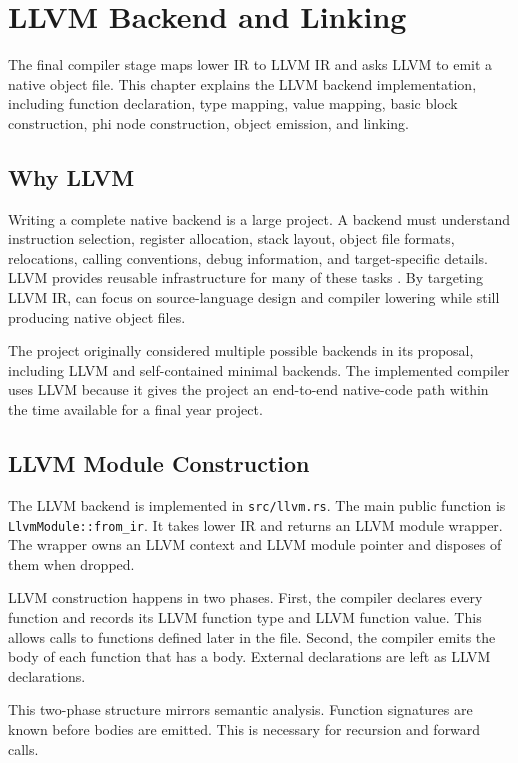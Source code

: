 \chapter{LLVM Backend and Linking}
\label{chap:llvm}

The final compiler stage maps lower IR to LLVM IR and asks LLVM to emit a native
object file. This chapter explains the LLVM backend implementation, including
function declaration, type mapping, value mapping, basic block construction, phi
node construction, object emission, and linking.

\section{Why LLVM}

Writing a complete native backend is a large project. A backend must understand
instruction selection, register allocation, stack layout, object file formats,
relocations, calling conventions, debug information, and target-specific
details. LLVM provides reusable infrastructure for many of these tasks
\cite{lattner2004llvm,llvm_langref}. By targeting LLVM IR, \epl{} can focus on
source-language design and compiler lowering while still producing native object
files.

The project originally considered multiple possible backends in its proposal,
including LLVM and self-contained minimal backends. The implemented compiler
uses LLVM because it gives the project an end-to-end native-code path within the
time available for a final year project.

\section{LLVM Module Construction}

The LLVM backend is implemented in \texttt{src/llvm.rs}. The main public
function is \texttt{LlvmModule::from\_ir}. It takes lower IR and returns an LLVM
module wrapper. The wrapper owns an LLVM context and LLVM module pointer and
disposes of them when dropped.

LLVM construction happens in two phases. First, the compiler declares every
function and records its LLVM function type and LLVM function value. This allows
calls to functions defined later in the file. Second, the compiler emits the body
of each function that has a body. External declarations are left as LLVM
declarations.

This two-phase structure mirrors semantic analysis. Function signatures are
known before bodies are emitted. This is necessary for recursion and forward
calls.

